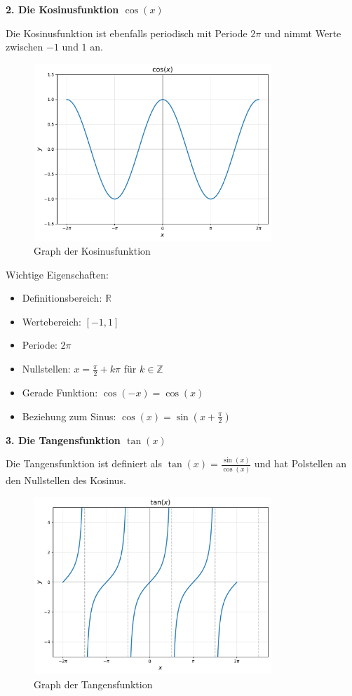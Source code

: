 \documentclass{article}
\begin{document}
\textbf{2. Die Kosinusfunktion $\cos(x)$}

Die Kosinusfunktion ist ebenfalls periodisch mit Periode $2\pi$ und nimmt Werte zwischen $-1$ und $1$ an.

\begin{figure}[!htbp]
\centering
\includegraphics[width=0.8\textwidth]{cos.pdf}
\caption{Graph der Kosinusfunktion}
\end{figure}

Wichtige Eigenschaften:
\begin{itemize}
\item Definitionsbereich: $\mathbb{R}$
\item Wertebereich: $[-1, 1]$
\item Periode: $2\pi$
\item Nullstellen: $x = \frac{\pi}{2} + k\pi$ für $k \in \mathbb{Z}$
\item Gerade Funktion: $\cos(-x) = \cos(x)$
\item Beziehung zum Sinus: $\cos(x) = \sin(x + \frac{\pi}{2})$
\end{itemize}

\textbf{3. Die Tangensfunktion $\tan(x)$}

Die Tangensfunktion ist definiert als $\tan(x) = \frac{\sin(x)}{\cos(x)}$ und hat Polstellen an den Nullstellen des Kosinus.

\begin{figure}[!htbp]
\centering
\includegraphics[width=0.8\textwidth]{tan.pdf}
\caption{Graph der Tangensfunktion}
\end{figure}
\end{document}
